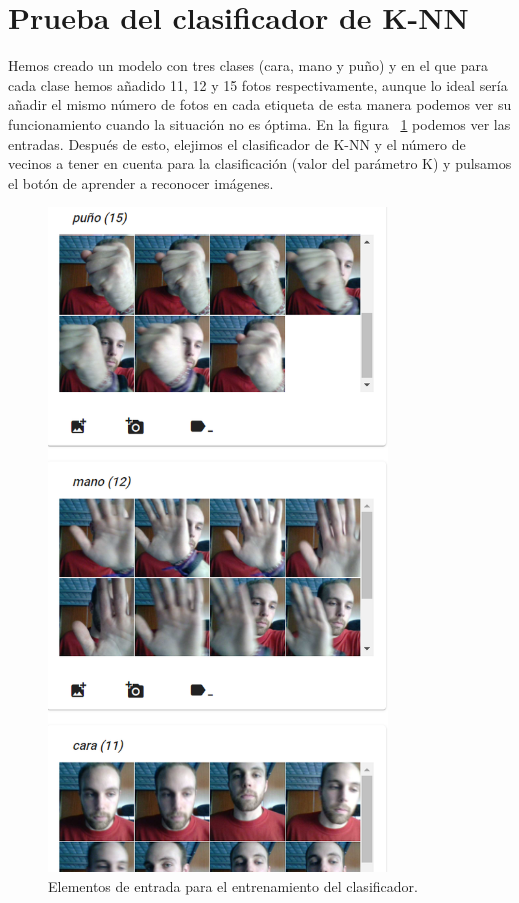 \documentclass[a4paper, 12pt]{book}
\begin{document}
\section{Prueba del clasificador de K-NN} 
\label{sec:pruebaknn}

Hemos creado un modelo con tres clases (cara, mano y puño) y en el que para cada clase hemos añadido 11, 12 y 15 fotos respectivamente, aunque lo ideal sería añadir el mismo número de fotos en cada etiqueta de esta manera podemos ver su funcionamiento cuando la situación no es óptima. En la figura ~\ref{fig:fotosentrada} podemos ver las entradas. Después de esto, elejimos el clasificador de K-NN y el número de vecinos a tener en cuenta para la clasificación (valor del parámetro K) y pulsamos el botón de aprender a reconocer imágenes.

\begin{figure}
	\centering
	\includegraphics[width=9cm, keepaspectratio]{img/fotosentrada}
	\caption{Elementos de entrada para el entrenamiento del clasificador.}			
	\label{fig:fotosentrada}
\end{figure}
\end{document}
